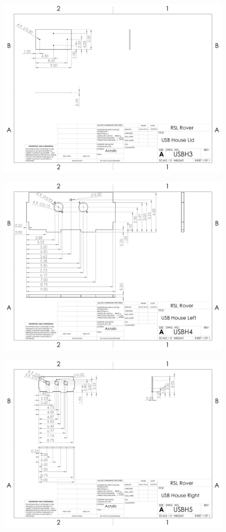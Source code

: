 \begin{figure}[H]
	\centerline{\includegraphics[angle=90,width=1.1\linewidth]{dwgs/USBH3.pdf}}
\end{figure}

\begin{figure}[H]
	\centerline{\includegraphics[angle=90,width=1.1\linewidth]{dwgs/USBH4.pdf}}
\end{figure}

\begin{figure}[H]
	\centerline{\includegraphics[angle=90,width=1.1\linewidth]{dwgs/USBH5.pdf}}
\end{figure}
